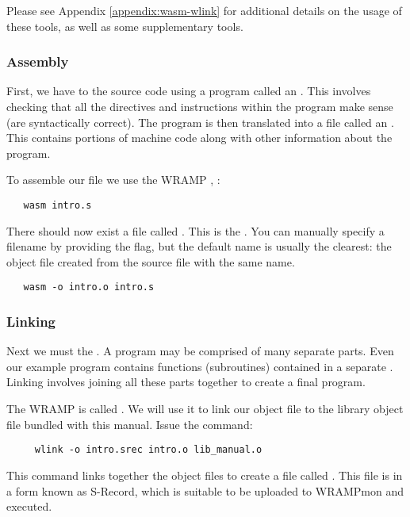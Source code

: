 Please see Appendix \ref{appendix:wasm-wlink} for additional details
on the usage of these tools, as well as some supplementary tools.

\subsubsection{Assembly}
First, we have to  the source code using a program
called an . This involves checking that all the
directives and instructions within the program make sense (are
syntactically correct). The program is then translated into a file
called an . This contains portions of machine code
along with other information about the program.

To assemble our file we use the WRAMP , :
\begin{verbatim}
   wasm intro.s
\end{verbatim}

There should now exist a file called . This is the 
. You can manually specify a filename by providing the
 flag, but the default name is usually the clearest: the
object file created from the source file with the same name.

\begin{verbatim}
   wasm -o intro.o intro.s
\end{verbatim}

\subsubsection{Linking}
Next we must  the . A program may be
comprised of many separate parts. Even our example program contains
functions (subroutines) contained in a separate . Linking
involves joining all these parts together to create a final program.

The WRAMP  is called . We will use it to
link our object file to the library object file bundled with this manual.
Issue the command:
\begin{verbatim}
     wlink -o intro.srec intro.o lib_manual.o
\end{verbatim}

This command links together the object files to create a file called
. This file is in a form known as S-Record, which
is suitable to be uploaded to WRAMPmon and executed.

%
%
%
